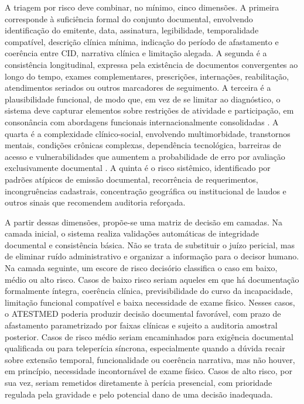 \documentclass[12pt,a4paper]{article}
\begin{document}
A triagem por risco deve combinar, no mínimo, cinco dimensões. A primeira corresponde à suficiência formal do conjunto documental, envolvendo identificação do emitente, data, assinatura, legibilidade, temporalidade compatível, descrição clínica mínima, indicação do período de afastamento e coerência entre CID, narrativa clínica e limitação alegada. A segunda é a consistência longitudinal, expressa pela existência de documentos convergentes ao longo do tempo, exames complementares, prescrições, internações, reabilitação, atendimentos seriados ou outros marcadores de seguimento. A terceira é a plausibilidade funcional, de modo que, em vez de se limitar ao diagnóstico, o sistema deve capturar elementos sobre restrições de atividade e participação, em consonância com abordagens funcionais internacionalmente consolidadas \parencite{guo2017assessmentofaphasiaacrosstheinternationalclassification, nogueira20200731t0100000100aavaliacaodadeficiencianatraje}. A quarta é a complexidade clínico-social, envolvendo multimorbidade, transtornos mentais, condições crônicas complexas, dependência tecnológica, barreiras de acesso e vulnerabilidades que aumentem a probabilidade de erro por avaliação exclusivamente documental \parencite{feudtner2014pediatriccomplexchronicconditionsclassificationsyst, hospital2016mentaldisabilityaretrospectivestudyofsocioclinica, m2024astudyofdisabilityseveritybarriersandfacilitatingfactor}. A quinta é o risco sistêmico, identificado por padrões atípicos de emissão documental, recorrência de requerimentos, incongruências cadastrais, concentração geográfica ou institucional de laudos e outros sinais que recomendem auditoria reforçada.

A partir dessas dimensões, propõe-se uma matriz de decisão em camadas. Na camada inicial, o sistema realiza validações automáticas de integridade documental e consistência básica. Não se trata de substituir o juízo pericial, mas de eliminar ruído administrativo e organizar a informação para o decisor humano. Na camada seguinte, um escore de risco decisório classifica o caso em baixo, médio ou alto risco. Casos de baixo risco seriam aqueles em que há documentação formalmente íntegra, coerência clínica, previsibilidade do curso da incapacidade, limitação funcional compatível e baixa necessidade de exame físico. Nesses casos, o ATESTMED poderia produzir decisão documental favorável, com prazo de afastamento parametrizado por faixas clínicas e sujeito a auditoria amostral posterior. Casos de risco médio seriam encaminhados para exigência documental qualificada ou para teleperícia síncrona, especialmente quando a dúvida recair sobre extensão temporal, funcionalidade ou coerência narrativa, mas não houver, em princípio, necessidade incontornável de exame físico. Casos de alto risco, por sua vez, seriam remetidos diretamente à perícia presencial, com prioridade regulada pela gravidade e pelo potencial dano de uma decisão inadequada.
\end{document}
